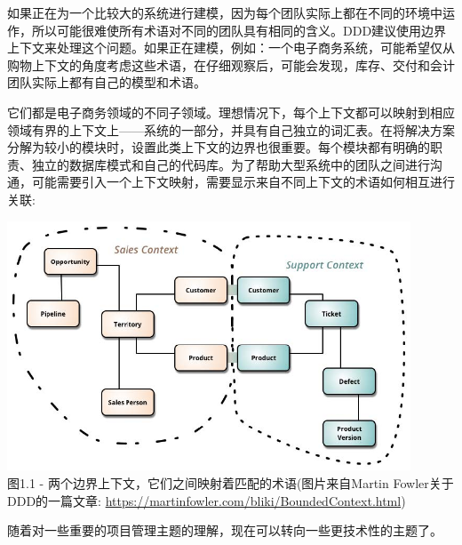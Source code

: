 如果正在为一个比较大的系统进行建模，因为每个团队实际上都在不同的环境中运作，所以可能很难使所有术语对不同的团队具有相同的含义。DDD建议使用边界上下文来处理这个问题。如果正在建模，例如：一个电子商务系统，可能希望仅从购物上下文的角度考虑这些术语，在仔细观察后，可能会发现，库存、交付和会计团队实际上都有自己的模型和术语。

它们都是电子商务领域的不同子领域。理想情况下，每个上下文都可以映射到相应领域有界的上下文上——系统的一部分，并具有自己独立的词汇表。在将解决方案分解为较小的模块时，设置此类上下文的边界也很重要。每个模块都有明确的职责、独立的数据库模式和自己的代码库。为了帮助大型系统中的团队之间进行沟通，可能需要引入一个上下文映射，需要显示来自不同上下文的术语如何相互进行关联:

\begin{center}
\includegraphics[width=0.9\textwidth]{content/1/chapter1/images/1.jpg}\\
图1.1 - 两个边界上下文，它们之间映射着匹配的术语(图片来自Martin Fowler关于DDD的一篇文章: \url{https://martinfowler.com/bliki/BoundedContext.html})
\end{center}

随着对一些重要的项目管理主题的理解，现在可以转向一些更技术性的主题了。









